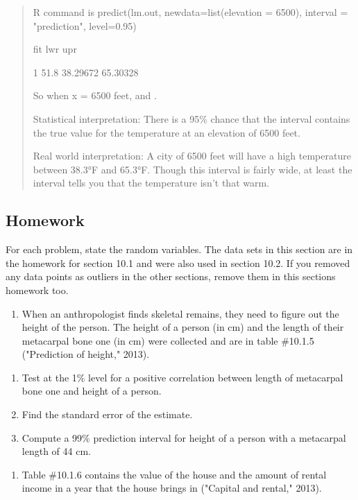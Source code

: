 \documentclass[]{book}
\providecommand{\tightlist}{%
  \setlength{\itemsep}{0pt}\setlength{\parskip}{0pt}}
\begin{document}
\begin{quote}
R command is predict(lm.out, newdata=list(elevation = 6500), interval
= "prediction", level=0.95)

fit lwr upr

1 51.8 38.29672 65.30328

So when x = 6500 feet, and .

Statistical interpretation: There is a 95\% chance that the interval
contains the true value for the temperature at an elevation of 6500
feet.

Real world interpretation: A city of 6500 feet will have a high
temperature between 38.3°F and 65.3°F. Though this interval is fairly
wide, at least the interval tells you that the temperature isn't that
warm.
\end{quote}

\hypertarget{homework-31}{%
\subsection{Homework}\label{homework-31}}

For each problem, state the random variables. The data sets in this section are in the homework for section 10.1 and were also used in section 10.2. If you removed any data points as outliers in the other sections, remove them in this sections homework too.

\begin{enumerate}
\def\labelenumi{\arabic{enumi}.}
\tightlist
\item
  When an anthropologist finds skeletal remains, they need to figure out the height of the person. The height of a person (in cm) and the length of their metacarpal bone one (in cm) were collected and are in table \#10.1.5 ("Prediction of height," 2013).
\end{enumerate}

\begin{enumerate}
\def\labelenumi{\alph{enumi}.}
\item
  Test at the 1\% level for a positive correlation between length of metacarpal bone one and height of a person.
\item
  Find the standard error of the estimate.
\item
  Compute a 99\% prediction interval for height of a person with a metacarpal length of 44 cm.
\end{enumerate}

\begin{enumerate}
\def\labelenumi{\arabic{enumi}.}
\setcounter{enumi}{1}
\tightlist
\item
  Table \#10.1.6 contains the value of the house and the amount of rental income in a year that the house brings in ("Capital and rental," 2013).
\end{enumerate}
\end{document}
